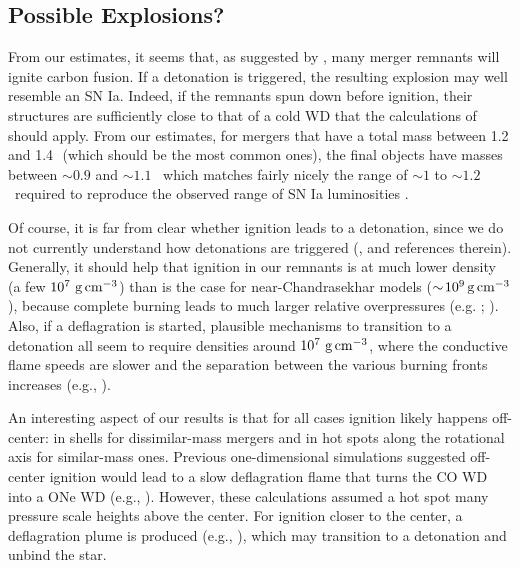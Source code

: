 \subsection{Possible Explosions?}

From our estimates, it seems that, as suggested by \citeal{vkercj10}, many merger remnants will ignite carbon fusion.  If a detonation is triggered, the resulting explosion may well resemble an SN Ia.  Indeed, if the remnants spun down before ignition, their structures are sufficiently close to that of a cold WD that the calculations of \cite{sim+10} should apply.  From our estimates, for mergers that have a total mass between 1.2 and 1.4\,\Msun\ (which should be the most common ones), the final objects have masses between $\sim\!0.9$ and $\sim\!1.1$ \Msun\, which matches fairly nicely the range of $\sim\!1$ to $\sim\!1.2$ \Msun\ required to reproduce the observed range of SN Ia luminosities \citep{sim+10}.


Of course, it is far from clear whether ignition leads to a detonation, since we do not currently understand how detonations are triggered (\citealt{seit+09,woos+11}, and references therein).  Generally, it should help that ignition in our remnants is at much lower density (a few $10^7\,{\rm\,g\,cm^{-3}}$) than is the case for near-Chandrasekhar models ($\sim\!10^9{\rm\,g\,cm^{-3}}$), because complete burning leads to much larger relative overpressures (e.g. \citealt{mazumw77}; \citealt{seit+09}).  Also, if a deflagration is started, plausible mechanisms to transition to a detonation all seem to require densities around $10^7\,{\rm\,g\,cm^{-3}}$, where the conductive flame speeds are slower and the separation between the various burning fronts increases (e.g., \citealt{woos+09,woos+11}).

An interesting aspect of our results is that for all cases ignition likely happens off-center: in shells for dissimilar-mass mergers and in hot spots along the rotational axis for similar-mass ones.  Previous one-dimensional simulations suggested off-center ignition would lead to a slow deflagration flame that turns the CO WD into a ONe WD (e.g., \citealt{saion85}).  However, these calculations assumed a hot spot many pressure scale heights above the center.  For ignition closer to the center, a deflagration plume is produced (e.g., \citealt{aspd+11}), which may transition to a detonation \citep{seitcr11} and unbind the star.   

